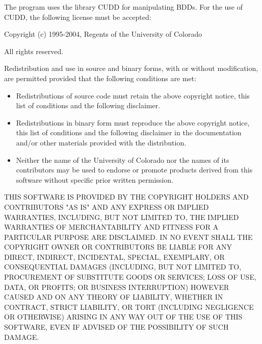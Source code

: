 \documentclass{article}
\newcommand{\href}[2]{\Link[#1]{}{} #2 \EndLink}
\begin{document}
\vspace{3mm}

The program uses the library \href{http://vlsi.colorado.edu/\%7Efabio/}{CUDD} for manipulating BDDs.
For the use of CUDD, the following license must be accepted:

\vspace{3mm}

Copyright (c) 1995-2004, Regents of the University of Colorado

All rights reserved.

Redistribution and use in source and binary forms, with or without
modification, are permitted provided that the following conditions
are met:

\begin{itemize}
\item
Redistributions of source code must retain the above copyright
notice, this list of conditions and the following disclaimer.
\item
Redistributions in binary form must reproduce the above copyright
notice, this list of conditions and the following disclaimer in the
documentation and/or other materials provided with the distribution.
\item
Neither the name of the University of Colorado nor the names of its
contributors may be used to endorse or promote products derived from
this software without specific prior written permission.
\end{itemize}
THIS SOFTWARE IS PROVIDED BY THE COPYRIGHT HOLDERS AND CONTRIBUTORS
"AS IS" AND ANY EXPRESS OR IMPLIED WARRANTIES, INCLUDING, BUT NOT
LIMITED TO, THE IMPLIED WARRANTIES OF MERCHANTABILITY AND FITNESS
FOR A PARTICULAR PURPOSE ARE DISCLAIMED. IN NO EVENT SHALL THE
COPYRIGHT OWNER OR CONTRIBUTORS BE LIABLE FOR ANY DIRECT, INDIRECT,
INCIDENTAL, SPECIAL, EXEMPLARY, OR CONSEQUENTIAL DAMAGES (INCLUDING,
BUT NOT LIMITED TO, PROCUREMENT OF SUBSTITUTE GOODS OR SERVICES;
LOSS OF USE, DATA, OR PROFITS; OR BUSINESS INTERRUPTION) HOWEVER
CAUSED AND ON ANY THEORY OF LIABILITY, WHETHER IN CONTRACT, STRICT
LIABILITY, OR TORT (INCLUDING NEGLIGENCE OR OTHERWISE) ARISING IN
ANY WAY OUT OF THE USE OF THIS SOFTWARE, EVEN IF ADVISED OF THE
POSSIBILITY OF SUCH DAMAGE.




\end{document}
